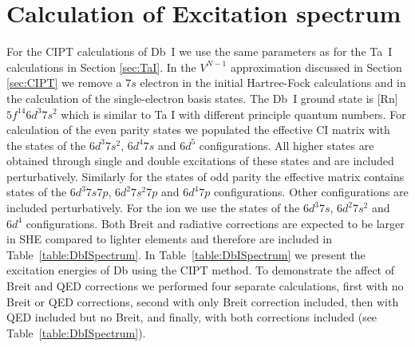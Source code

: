 \documentclass[10pt,a4paper, twoside]{report}
\begin{document}
\section{Calculation of Excitation spectrum}
For the CIPT calculations of Db~I we use the same parameters as for the Ta~I calculations in Section \ref{sec:TaI}. In the $V^{N-1}$ approximation discussed in Section \ref{sec:CIPT} we remove a $7s$ electron in the initial Hartree-Fock calculations and in the calculation of the single-electron basis states. The Db~I ground state is [Rn]$5f^{14}6d^3 7s^2$ which is similar to Ta I with different principle quantum numbers. For calculation of the even parity states we populated the effective CI matrix with the states of the $6d^3 7s^2$,  $6d^4 7s$ and $6d^5$ configurations. All higher states are obtained through single and double excitations of these states and are included perturbatively. Similarly for  the states of odd parity the effective matrix contains states of the  $6d^3 7s 7p$, $6d^2 7s^2 7p$ and $6d^4 7p$ configurations. Other configurations are included perturbatively. For the ion  we use the states of the $6d^3 7s$, $6d^2 7s^2$ and $6d^4$ configurations.  Both Breit and radiative corrections are expected to be larger in SHE compared to lighter elements and therefore are included in Table~\ref{table:DbISpectrum}. In Table~\ref{table:DbISpectrum} we present the excitation energies of Db using the CIPT method. To demonstrate the affect of  Breit and QED corrections we performed four separate calculations,
first with no Breit or QED corrections, second with only Breit correction included, then with QED included but no Breit, and finally,
with both corrections included (see Table~\ref{table:DbISpectrum}).
\end{document}
